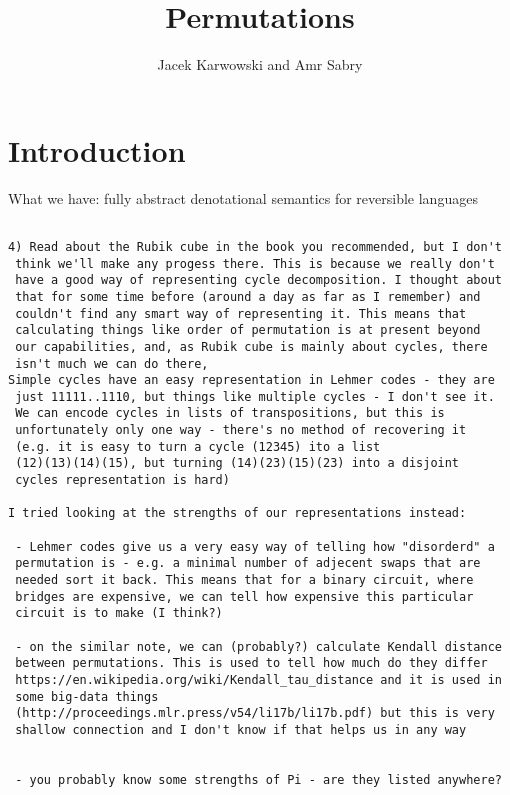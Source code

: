 \documentclass{article}
\title{Permutations}
\author{Jacek Karwowski and Amr Sabry}
\begin{document}
\maketitle

\section{Introduction}



What we have: fully abstract denotational semantics for reversible languages

\begin{verbatim}

4) Read about the Rubik cube in the book you recommended, but I don't
 think we'll make any progess there. This is because we really don't
 have a good way of representing cycle decomposition. I thought about
 that for some time before (around a day as far as I remember) and
 couldn't find any smart way of representing it. This means that
 calculating things like order of permutation is at present beyond
 our capabilities, and, as Rubik cube is mainly about cycles, there
 isn't much we can do there,
Simple cycles have an easy representation in Lehmer codes - they are
 just 11111..1110, but things like multiple cycles - I don't see it.
 We can encode cycles in lists of transpositions, but this is
 unfortunately only one way - there's no method of recovering it
 (e.g. it is easy to turn a cycle (12345) ito a list
 (12)(13)(14)(15), but turning (14)(23)(15)(23) into a disjoint
 cycles representation is hard)

I tried looking at the strengths of our representations instead:

 - Lehmer codes give us a very easy way of telling how "disorderd" a
 permutation is - e.g. a minimal number of adjecent swaps that are
 needed sort it back. This means that for a binary circuit, where
 bridges are expensive, we can tell how expensive this particular
 circuit is to make (I think?) 

 - on the similar note, we can (probably?) calculate Kendall distance
 between permutations. This is used to tell how much do they differ
 https://en.wikipedia.org/wiki/Kendall_tau_distance and it is used in
 some big-data things
 (http://proceedings.mlr.press/v54/li17b/li17b.pdf) but this is very
 shallow connection and I don't know if that helps us in any way


 - you probably know some strengths of Pi - are they listed anywhere?


\end{verbatim}
\end{document}
